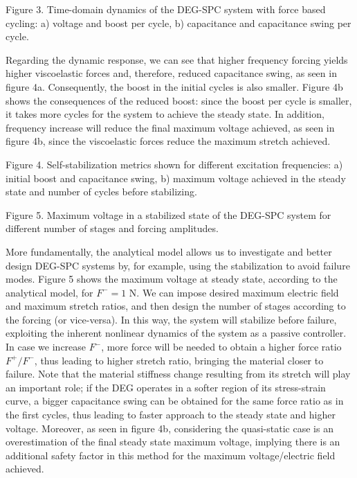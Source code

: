   
Figure 3. Time-domain dynamics of the DEG-SPC system with force based cycling: a) voltage and boost per cycle, b) capacitance and capacitance swing per cycle.

Regarding the dynamic response, we can see that higher frequency forcing yields higher viscoelastic forces and, therefore, reduced capacitance swing, as seen in figure 4a. Consequently, the boost in the initial cycles is also smaller. Figure 4b shows the consequences of the reduced boost: since the boost per cycle is smaller, it takes more cycles for the system to achieve the steady state. In addition, frequency increase will reduce the final maximum voltage achieved, as seen in figure 4b, since the viscoelastic forces reduce the maximum stretch achieved.

  
Figure 4. Self-stabilization metrics shown for different excitation frequencies: a) initial boost and capacitance swing, b) maximum voltage achieved in the steady state and number of cycles before stabilizing.

 
Figure 5. Maximum voltage in a stabilized state of the DEG-SPC system for different number of stages and forcing amplitudes.

More fundamentally, the analytical model allows us to investigate and better design DEG-SPC systems by, for example, using the stabilization to avoid failure modes. Figure 5 shows the maximum voltage at steady state, according to the analytical model, for $F^-=1$ N. We can impose desired maximum electric field and maximum stretch ratios, and then design the number of stages according to the forcing (or vice-versa). In this way, the system will stabilize before failure, exploiting the inherent nonlinear dynamics of the system as a passive controller. In case we increase $F^-$, more force will be needed to obtain a higher force ratio $F^+/F^-$, thus leading to higher stretch ratio, bringing the material closer to failure. Note that the material stiffness change resulting from its stretch will play an important role; if the DEG operates in a softer region of its stress-strain curve, a bigger capacitance swing can be obtained for the same force ratio as in the first cycles, thus leading to faster approach to the steady state and higher voltage. Moreover, as seen in figure 4b, considering the quasi-static case is an overestimation of the final steady state maximum voltage, implying there is an additional safety factor in this method for the maximum voltage/electric field achieved.


